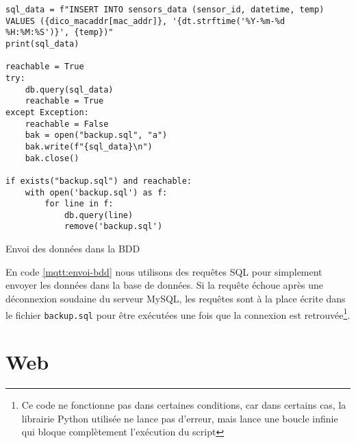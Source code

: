 \documentclass{article}
\begin{document}
    \begin{listing}[H]
        \begin{verbatim}
sql_data = f"INSERT INTO sensors_data (sensor_id, datetime, temp) VALUES ({dico_macaddr[mac_addr]}, '{dt.strftime('%Y-%m-%d %H:%M:%S')}', {temp})"
print(sql_data)

reachable = True
try:
    db.query(sql_data)
    reachable = True
except Exception:
    reachable = False
    bak = open("backup.sql", "a")
    bak.write(f"{sql_data}\n")
    bak.close()

if exists("backup.sql") and reachable:
    with open('backup.sql') as f:
        for line in f:
            db.query(line)
            remove('backup.sql')
        \end{verbatim}
        \caption{Envoi des données dans la BDD}
        \label{mqtt:envoi-bdd}
    \end{listing}
    En code \ref{mqtt:envoi-bdd} nous utilisons des requêtes SQL pour simplement envoyer les données dans la base de données. 
    Si la requête échoue après une déconnexion soudaine du serveur MySQL, les requêtes sont à la place écrite dans le fichier \verb|backup.sql| pour être exécutées une fois que la connexion est retrouvée\footnote{Ce code ne fonctionne pas dans certaines conditions, car dans certains cas, la librairie Python utilisée ne lance pas d'erreur, mais lance une boucle infinie qui bloque complètement l'exécution du script}.
\newpage
\section{Web}
\label{section:web}
\end{document}
